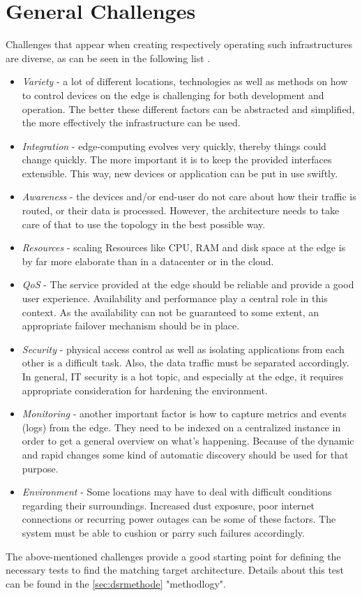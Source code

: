 \documentclass[MSC,Master,english]{twbook}%
\begin{document}
\section{General Challenges} 
\label{sec:generalchallanges}
Challenges that appear when creating respectively operating such infrastructures are diverse, as can be seen in the following list \cite{intro-edge}.

\begin{itemize}
    \item \textit{Variety} - a lot of different locations, technologies as well as methods on how to control devices on the edge is challenging for both development and operation. The better these different factors can be abstracted and simplified, the more effectively the infrastructure can be used.
    \item \textit{Integration} - edge-computing evolves very quickly, thereby things could change quickly. The more important it is to keep the provided interfaces extensible. This way, new devices or application can be put in use swiftly. 
    \item \textit{Awareness} - the devices and/or end-user do not care about how their traffic is routed, or their data is processed. However, the architecture needs to take care of that to use the topology in the best possible way.
    \item \textit{Resources} - scaling Resources like \ac{CPU}, \ac{RAM} and disk space at the edge is by far more elaborate than in a datacenter or in the cloud.
    \item \textit{\ac{QoS}} - The service provided at the edge should be reliable and provide a good user experience. Availability and performance play a central role in this context. As the availability can not be guaranteed to some extent, an appropriate failover mechanism should be in place.
    \item \textit{Security} - physical access control as well as isolating applications from each other is a difficult task. Also, the data traffic must be separated accordingly. In general, \ac{IT} security is a hot topic, and especially at the edge, it requires appropriate consideration for hardening the environment.
    \item \textit{Monitoring} - another important factor is how to capture metrics and events (logs) from the edge. They need to be indexed on a centralized instance in order to get a general overview on what's happening. Because of the dynamic and rapid changes some kind of automatic discovery should be used for that purpose.
    \item \textit{Environment} - Some locations may have to deal with difficult conditions regarding their surroundings. Increased dust exposure, poor internet connections or recurring power outages can be some of these factors. The system must be able to cushion or parry such failures accordingly.
\end{itemize}
The above-mentioned challenges provide a good starting point for defining the necessary tests to find the matching target architecture. Details about this test can be found in the \autoref{sec:dsrmethode} "methodlogy".
\end{document}
